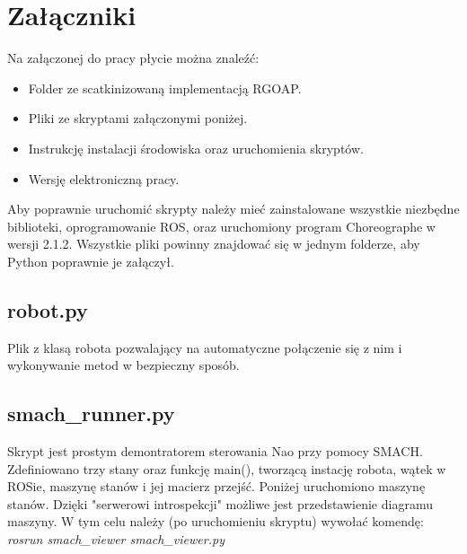 \newcommand{\mychapter}[2]{
    \setcounter{chapter}{#1}
    \setcounter{section}{0}
    \chapter*{#2}
    \addcontentsline{toc}{chapter}{#2}
}

\chapter{Załączniki}
\label{chap:zalaczniki}

Na załączonej do pracy płycie można znaleźć:
\begin{itemize}
\setlength\itemsep{-0.5em}
    \item Folder ze scatkinizowaną implementacją RGOAP.
    \item Pliki ze skryptami załączonymi poniżej.
    \item Instrukcję instalacji środowiska oraz uruchomienia skryptów.
    \item Wersję elektroniczną pracy.
\end{itemize}

Aby poprawnie uruchomić skrypty należy mieć zainstalowane wszystkie niezbędne biblioteki, oprogramowanie ROS, oraz uruchomiony program Choreographe w wersji 2.1.2. Wszystkie pliki powinny znajdować się w jednym folderze, aby Python poprawnie je załączył.

\section*{robot.py}
Plik z klasą robota pozwalający na automatyczne połączenie się z nim i wykonywanie metod w bezpieczny sposób.


\section*{smach\_runner.py}
Skrypt jest prostym demontratorem sterowania Nao przy pomocy SMACH. Zdefiniowano trzy stany oraz funkcję main(), tworzącą instację robota, wątek w ROSie, maszynę stanów i jej macierz przejść. Poniżej uruchomiono maszynę stanów. Dzięki "serwerowi introspekcji" możliwe jest przedstawienie diagramu maszyny. W tym celu należy (po uruchomieniu skryptu) wywołać komendę: \textit{rosrun smach\_viewer smach\_viewer.py}


